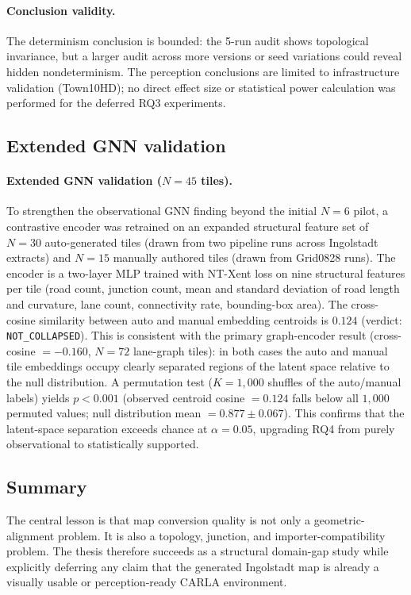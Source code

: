 \paragraph{Conclusion validity.}
The determinism conclusion is bounded: the 5-run audit shows topological invariance, but a larger audit across more versions or seed variations could reveal hidden nondeterminism. The perception conclusions are limited to infrastructure validation (Town10HD); no direct effect size or statistical power calculation was performed for the deferred RQ3 experiments.

\subsection{Extended GNN validation}
\label{sec:extended_gnn}

\paragraph{Extended GNN validation ($N=45$ tiles).}
To strengthen the observational GNN finding beyond the initial $N=6$ pilot, a contrastive encoder was retrained on an expanded structural feature set of $N=30$ auto-generated tiles (drawn from two pipeline runs across Ingolstadt extracts) and $N=15$ manually authored tiles (drawn from Grid0828 runs). The encoder is a two-layer MLP trained with NT-Xent loss on nine structural features per tile (road count, junction count, mean and standard deviation of road length and curvature, lane count, connectivity rate, bounding-box area). The cross-cosine similarity between auto and manual embedding centroids is $0.124$ (verdict: \texttt{NOT\_COLLAPSED}). This is consistent with the primary graph-encoder result (cross-cosine $= -0.160$, $N = 72$ lane-graph tiles): in both cases the auto and manual tile embeddings occupy clearly separated regions of the latent space relative to the null distribution. A permutation test ($K = 1{,}000$ shuffles of the auto/manual labels) yields $p < 0.001$ (observed centroid cosine $= 0.124$ falls below all $1{,}000$ permuted values; null distribution mean $= 0.877 \pm 0.067$). This confirms that the latent-space separation exceeds chance at $\alpha = 0.05$, upgrading RQ4 from purely observational to statistically supported.

\subsection{Summary}
The central lesson is that map conversion quality is not only a geometric-alignment problem. It is also a topology, junction, and importer-compatibility problem. The thesis therefore succeeds as a structural domain-gap study while explicitly deferring any claim that the generated Ingolstadt map is already a visually usable or perception-ready CARLA environment.
